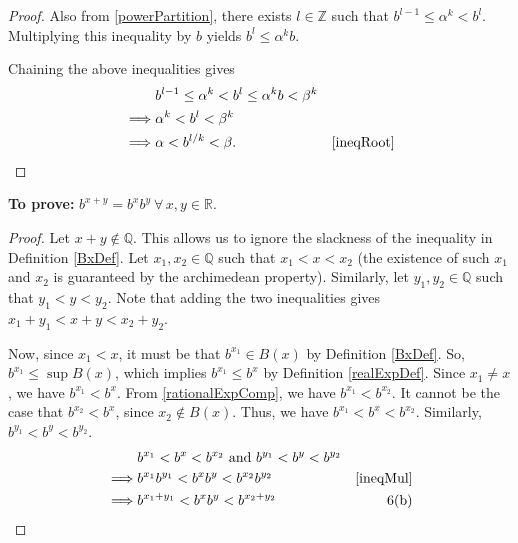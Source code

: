 \documentclass[12pt]{article}
\begin{document}
\begin {enumerate} [(a)]
\begin{proof}
      Also from \ref{powerPartition},
      there exists $l \in \mathbb{Z}$ such that $b^{l-1} \le \alpha^k < b^{l}$. Multiplying
      this inequality by $b$ yields $b^{l} \le \alpha^kb$.

      Chaining the above inequalities gives
      \begin{align*}
                     & b^{l-1} \le \alpha^k < b^{l} \le \alpha^kb< \beta^k &                \\
            \implies & \alpha^k < b^{l} < \beta^k                          &                \\
            \implies & \alpha < b^{l/k} < \beta.                            & \ref{ineqRoot}
      \end{align*}

\end{proof}

{\bf To prove:}
$b^{x+y} = b^xb^y \ \forall \,x, y \in \mathbb{R}$.

\begin{proof}
      Let $x+y \notin \mathbb{Q}$. This allows us to ignore the slackness of the inequality
      in Definition \ref{BxDef}. Let $x_1, x_2 \in \mathbb{Q}$ such that $x_1 < x < x_2$ (the existence of
      such $x_1$ and $x_2$ is guaranteed by the archimedean property). Similarly,
      let $y_1, y_2 \in \mathbb{Q}$ such that $y_1 < y < y_2$. Note that adding the two
      inequalities gives $x_1 + y_1< x + y< x_2 + y_2$.

      Now, since $x_1 < x$, it must be that $b^{x_1} \in B(x)$ by Definition \ref{BxDef}.
      So, $b^{x_1} \le \sup B(x)$, which implies $b^{x_1} \le b^x$ by Definition \ref{realExpDef}.
      Since $x_1 \ne x$, we have $b^{x_1} < b^x$. From \ref{rationalExpComp}, we have
      $b^{x_1}  < b^{x_2}$. It cannot be the case that $b^{x_2} < b^x$,
      since $x_2 \notin B(x)$. Thus, we have $b^{x_1}  < b^x<b^{x_2}$. Similarly,
      $b^{y_1}  < b^y<b^{y_2}$.
      \begin{align*}
                     & b^{x_1}  < b^x<b^{x_2} \text{ and } b^{y_1}  < b^y<b^{y_2}                 \\
            \implies & b^{x_1}  b^{y_1}  < b^xb^y<b^{x_2}b^{y_2}                  & \ref{ineqMul} \\
            \implies & b^{x_1+y_1}  < b^xb^y<b^{x_2+y_2}                          & \text{6(b)}
      \end{align*}


\end{proof}
\end{enumerate}
\end{document}

